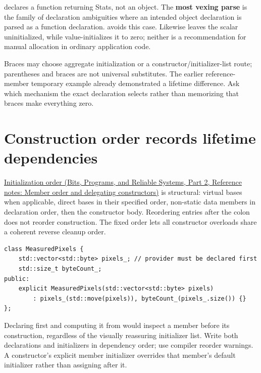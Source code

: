  declares a function returning Stats, not an object. The \textbf{most vexing parse} is the family of declaration ambiguities where an intended object declaration is parsed as a function declaration.  avoids this case. Likewise  leaves the scalar uninitialized, while  value-initializes it to zero; neither is a recommendation for manual allocation in ordinary application code.

Braces may choose aggregate initialization or a constructor/initializer-list route; parentheses and braces are not universal substitutes. The earlier reference-member temporary example already demonstrated a lifetime difference. Ask which mechanism the exact declaration selects rather than memorizing that braces make everything zero.

\section{Construction order records lifetime dependencies}\label{05-engine-i-ch003-construction-order-records-lifetime-dependencies}

\hypertarget{05-engine-i-ch003-construction-order-records-lifetime-dependencies}{}

\href{../01-Bits-Programs-and-Reliable-Systems-P02/main.pdf\#nameddest=appendix-3cb49709605a}{Initialization order (Bits, Programs, and Reliable Systems, Part 2, Reference notes: Member order and delegating constructors)} is structural: virtual bases when applicable, direct bases in their specified order, non-static data members in declaration order, then the constructor body. Reordering entries after the colon does not reorder construction. The fixed order lets all constructor overloads share a coherent reverse cleanup order.

\begin{verbatim}
class MeasuredPixels {
    std::vector<std::byte> pixels_; // provider must be declared first
    std::size_t byteCount_;
public:
    explicit MeasuredPixels(std::vector<std::byte> pixels)
        : pixels_(std::move(pixels)), byteCount_(pixels_.size()) {}
};
\end{verbatim}

Declaring  first and computing it from  would inspect a member before its construction, regardless of the visually reassuring initializer list. Write both declarations and initializers in dependency order; use compiler reorder warnings. A constructor's explicit member initializer overrides that member's default initializer rather than assigning after it.


